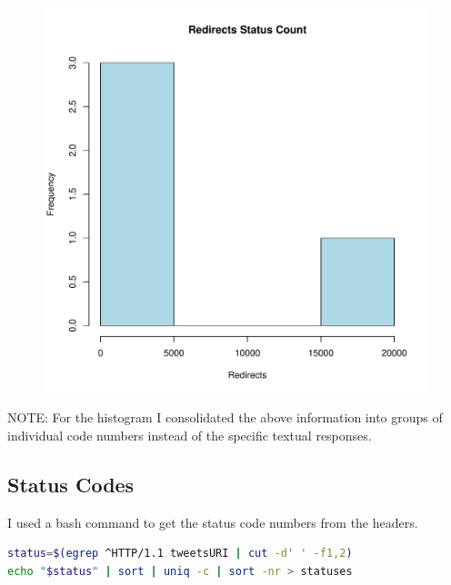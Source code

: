 \documentclass[12pt]{article}
\begin{document}
\begin{figure}[H]
    \centering
    \includegraphics{redirectsPlot.pdf}
\end{figure}
NOTE: For the histogram I consolidated the above information into groups of individual code numbers instead of the specific textual responses.

\subsection{Status Codes}

I used a bash command to get the status code numbers from the headers.

\begin{lstlisting}[language=bash,caption={bash code}]
status=$(egrep ^HTTP/1.1 tweetsURI | cut -d' ' -f1,2)
echo "$status" | sort | uniq -c | sort -nr > statuses
\end{lstlisting}
\end{document}
